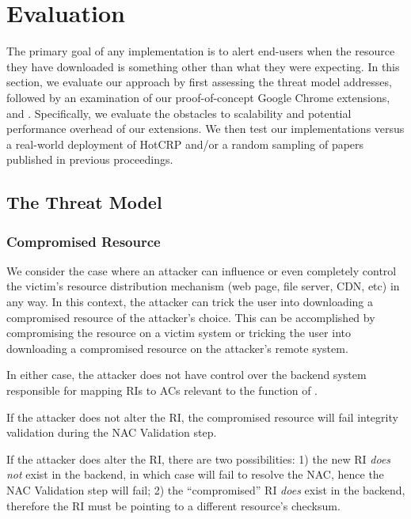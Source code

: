 \section{Evaluation} \label{sec:evaluation}

The primary goal of any \SYSTEM{} implementation is to alert end-users when the
resource they have downloaded is something other than what they were expecting.
In this section, we evaluate our approach by first assessing the threat model
\SYSTEM{} addresses, followed by an examination of our proof-of-concept Google
Chrome extensions, \DNSSYS{} and \DHTSYS{}. Specifically, we evaluate the
obstacles to scalability and potential performance overhead of our extensions.
We then test our implementations versus a real-world deployment of HotCRP and/or
a random sampling of papers published in previous \CONFERENCE{} proceedings.

\subsection{The Threat Model}

\subsubsection{Compromised Resource}

We consider the case where an attacker can influence or even completely control
the victim's resource distribution mechanism (web page, file server, CDN, etc)
in any way. In this context, the attacker can trick the user into downloading a
compromised resource of the attacker's choice. This can be accomplished by
compromising the resource on a victim system or tricking the user into
downloading a compromised resource on the attacker's remote system.

In either case, the attacker does not have control over the backend system
responsible for mapping RIs to ACs relevant to the function of \SYSTEM{}.

If the attacker does not alter the RI, the compromised resource will fail
integrity validation during the NAC Validation step.

If the attacker does alter the RI, there are two possibilities: 1) the new RI
\textit{does not} exist in the backend, in which case \SYSTEM{} will fail to
resolve the NAC, hence the NAC Validation step will fail; 2) the ``compromised''
RI \textit{does} exist in the backend, therefore the RI must be pointing to a
different resource's checksum.

